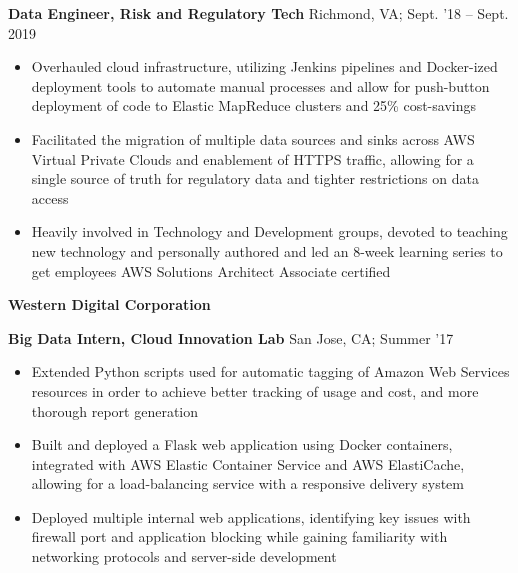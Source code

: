\documentclass[11pt]{article}
\begin{document}
\textbf{Data Engineer, Risk and Regulatory Tech} \hfill Richmond, VA; Sept. '18 -- Sept. 2019
\begin{itemize}
  \item Overhauled cloud infrastructure, utilizing Jenkins pipelines and
        Docker-ized deployment tools to automate manual processes and allow for
        push-button deployment of code to Elastic MapReduce clusters and 25\% cost-savings
  \item Facilitated the migration of multiple data sources and sinks across AWS Virtual
        Private Clouds and enablement of HTTPS traffic, allowing for a single source
        of truth for regulatory data and tighter restrictions on data access
  \item Heavily involved in Technology and Development groups, devoted to teaching
        new technology and personally authored and led an 8-week learning series
        to get employees AWS Solutions Architect Associate certified
\end{itemize}

\vspace{0.2cm}
{\Large\textbf{Western Digital Corporation}}

\textbf{Big Data Intern, Cloud Innovation Lab} \hfill San Jose, CA; Summer '17
\begin{itemize}
  \item Extended Python scripts used for automatic tagging of Amazon Web Services
        resources in order to achieve better tracking of usage and cost, and more
        thorough report generation
  \item Built and deployed a Flask web application using Docker containers,
        integrated with AWS Elastic Container Service and AWS ElastiCache, allowing
        for a load-balancing service with a responsive delivery system
  \item Deployed multiple internal web applications, identifying key issues with
        firewall port and application blocking while gaining familiarity with networking
        protocols and server-side development
\end{itemize}
\end{document}
